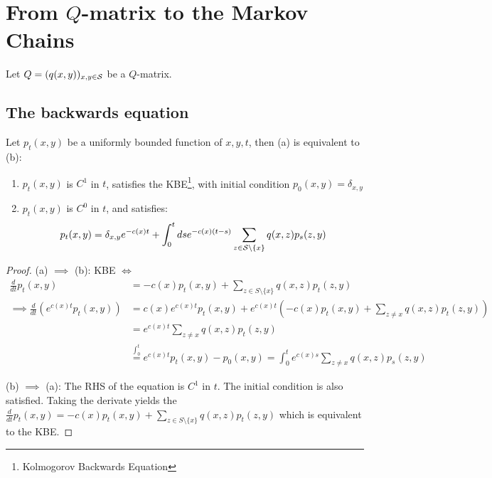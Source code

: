 \section{From \(Q\)-matrix to the Markov Chains}

Let \(Q=(q(x,y))_{x,y\in\mathcal{S}}\) be a \(Q\)-matrix.

\subsection{The backwards equation}

\begin{proposition}\label{prop:1.12}
    Let \(p_t(x,y)\) be a uniformly bounded function of \(x,y,t\), then (a) is equivalent to (b):
    \begin{enumerate}
        \item[(a)]\(p_t(x,y)\) is \(C^1\) in \(t\), satisfies the KBE\footnote{Kolmogorov Backwards Equation}, with initial condition \(p_0(x,y)=\delta_{x,y}\)
        \item[(b)] \(p_t(x,y)\) is \(C^0\) in \(t\), and satisfies:\begin{equation}\label{eq:A}p_t(x,y)=\delta_{x,y}e^{-c(x)t}+\int_0^t ds e^{-c(x)(t-s)}\sum_{z\in \mathcal{S}\setminus\{x\}}q(x,z)p_s(z,y)\end{equation}
    \end{enumerate}
\end{proposition}

\begin{proof}
    (a) \(\implies\) (b): KBE \(\iff\)
    \begin{align*}
        \frac{d}{dt}p_t(x,y)&=-c(x)p_t(x,y)+\sum_{z\in S\setminus\{x\}} q(x,z)p_t(z,y)\\
        \implies\frac{d}{dt}\left(e^{c(x)t}p_t(x,y)\right)&=c(x)e^{c(x)t}p_t(x,y)+e^{c(x)t}\left(-c(x)p_t(x,y)+\sum_{z\neq x}q(x,z)p_t(z,y)\right)\\
        &=e^{c(x)t}\sum_{z\neq x}q(x,z)p_t(z,y)\\
        &\stackrel{\int_0^t}{=} e^{c(x)t}p_t(x,y)-p_0(x,y)=\int_0^te^{c(x)s}\sum_{z\neq x}q(x,z)p_s(z,y)
    \end{align*}

    (b) \(\implies\) (a): The RHS of the equation is \(C^1\) in \(t\). The initial condition is also satisfied. Taking the derivate yields
    the \(\frac{d}{dt}p_t(x,y)=-c(x)p_t(x,y)+\sum_{z\in S\setminus\{x\}} q(x,z)p_t(z,y)\) which is equivalent to the KBE.
\end{proof}

